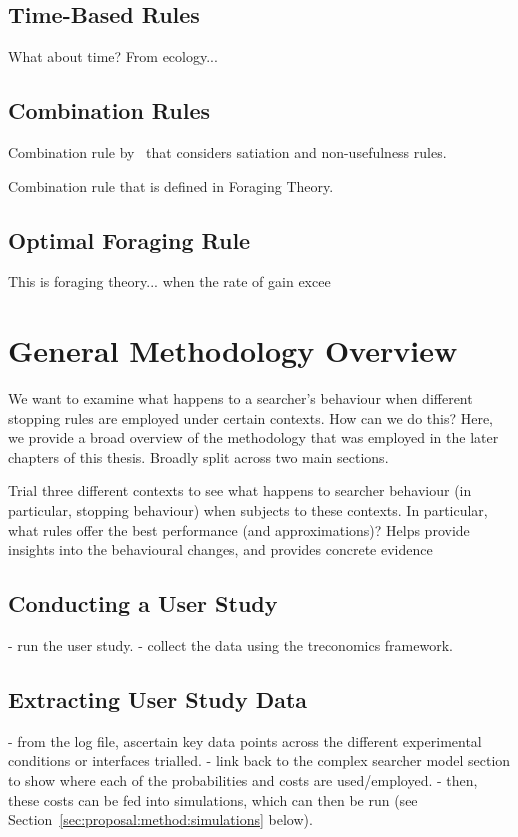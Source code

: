 \subsection{Time-Based Rules}
What about time? From ecology...


\subsection{Combination Rules}

Combination rule by~\citealt{kraft1979stopping_rules} that considers satiation and non-usefulness rules.

Combination rule that is defined in Foraging Theory.

\subsection{Optimal Foraging Rule}
This is foraging theory... when the rate of gain excee

\section{General Methodology Overview}\label{sec:proposal:method}

We want to examine what happens to a searcher's behaviour when different stopping rules are employed under certain contexts.
How can we do this? Here, we provide a broad overview of the methodology that was employed in the later chapters of this thesis. Broadly split across two main sections.

Trial three different contexts to see what happens to searcher behaviour (in particular, stopping behaviour) when subjects to these contexts. In particular, what rules offer the best performance (and approximations)? Helps provide insights into the behavioural changes, and provides concrete evidence 

\subsection{Conducting a User Study}
- run the user study.
- collect the data using the treconomics framework.

\subsection{Extracting User Study Data}
- from the log file, ascertain key data points across the different experimental conditions or interfaces trialled.
- link back to the complex searcher model section to show where each of the probabilities and costs are used/employed.
- then, these costs can be fed into simulations, which can then be run (see Section~\ref{sec:proposal:method:simulations} below).

